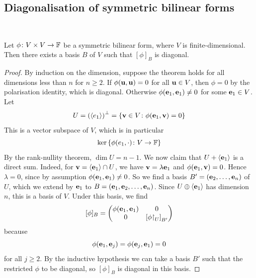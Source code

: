 \documentclass[a4paper,11pt]{article}
\begin{document}
\subsection{Diagonalisation of symmetric bilinear forms}
\ \vspace*{-1.5em}
\begin{theorem}
	Let \( \phi \colon V \times V \to {\mathbb{F}} \) be a symmetric bilinear form, where \( V \) is finite-dimensional.
	Then there exists a basis \( B \) of \( V \) such that \( [\phi]_B \) is diagonal.
\end{theorem}
\begin{proof}
	By induction on the dimension, suppose the theorem holds for all dimensions less than \( n \) for \( n \geq 2 \).
	If \( \phi({\bf u},{\bf u}) = 0 \) for all \( {\bf u} \in V \), then \( \phi = 0 \) by the polarisation identity, which is diagonal.
	Otherwise \( \phi({\bf e}_1, {\bf e}_1) \neq 0 \) for some \( {\bf e}_1 \in V \).
	Let
	\[
		U = \qty(\left\langle{} e_1 \right\rangle)^\perp = \qty{{\bf v}\in V \colon \phi({\bf e}_1, {\bf v}) = 0}
	\]
	This is a vector subspace of \( V \), which is in particular
	\[
		\ker \qty{ \phi(e_1, \cdot) \colon V \to {\mathbb{F}}}
	\]
	By the rank-nullity theorem, \( \dim U = n - 1 \).
	We now claim that \( U + \left\langle{} {\bf e}_1 \right\rangle \) is a direct sum.
	Indeed, for \( {\bf v} = \left\langle{} {\bf e}_1 \right\rangle \cap U \), we have \( {\bf v} = \lambda {\bf e}_1 \) and \( \phi({\bf e}_1, {\bf v}) = 0 \).
	Hence \( \lambda = 0 \), since by assumption \( \phi({\bf e}_1, {\bf e}_1) \neq 0 \).
	So we find a basis \( B' = ({\bf e}_2, \dots, {\bf e}_n) \) of \( U \), which we extend by \( {\bf e}_1 \) to \( B = ({\bf e}_1, {\bf e}_2, \dots, {\bf e}_n) \).
	Since \( U \oplus \left\langle{} {\bf e}_1 \right\rangle \) has dimension \( n \), this is a basis of \( V \).
	Under this basis, we find
	\[
		[\phi]_B = \begin{pmatrix}
			\phi({\bf e}_1, {\bf e}_1) & 0                          \\
			0              & \qty[{\phi}\mathord{\upharpoonright}_{U}]_{B'}
		\end{pmatrix}
	\]
	because
	\[
		\phi({\bf e}_1, {\bf e}_j) = \phi({\bf e}_j, {\bf e}_1) = 0
	\]
	for all \( j \geq 2 \).
	By the inductive hypothesis we can take a basis \( B' \) such that the restricted \( \phi \) to be diagonal, so \( [\phi]_B \) is diagonal in this basis.
\end{proof}
\end{document}
